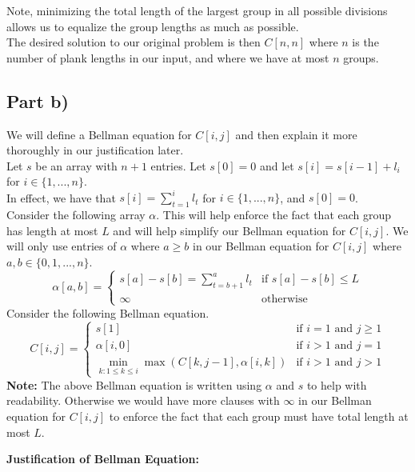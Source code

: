 \documentclass[12pt]{article}
\begin{document}
Note, minimizing the total length of the largest group in all possible divisions allows us to equalize the group lengths as much as possible. \\

The desired solution to our original problem is then $C[n,n]$ where $n$ is the number of plank lengths in our input, and where we have at most $n$ groups. 

\subsection*{Part b)}

We will define a Bellman equation for $C[i,j]$ and then explain it more thoroughly in our justification later. \\

Let $s$ be an array with $n+1$ entries. Let $s[0] = 0$ and let $s[i] = s[i-1] + l_i$ for $i \in \{1,...,n\}$. \\

In effect, we have that $s[i] = \sum_{t=1}^i l_t$ for $i \in \{1,...,n\}$, and $s[0] = 0$. \\

Consider the following array $\alpha$. This will help enforce the fact that each group has length at most $L$ and will help simplify our Bellman equation for $C[i,j]$. We will only use entries of $\alpha$ where $a \geq b$ in our Bellman equation for $C[i,j]$ where $a,b \in \{0,1,...,n\}$.
\[
  \alpha[a,b] =
  \begin{cases}
        s[a] - s[b] = \sum_{t=b+1}^a l_t &\text{if $s[a] - s[b] \leq L$} \\
        \infty &\text{otherwise}
  \end{cases}
\]
Consider the following Bellman equation.
\[
  C[i,j] =
  \begin{cases}
        s[1]    & \text{if $i = 1$ and $j \geq 1$} \\
        \alpha[i,0] &\text{if $i > 1$ and $j = 1$} \\
        \min\limits_{k: 1 \leq k \leq i} \max(C[k,j-1], \alpha[i,k]) &\text{if $i > 1$ and $j > 1$}       
  \end{cases}
\]
\textbf{Note:} The above Bellman equation is written using $\alpha$ and $s$ to help with readability. Otherwise we would have more clauses with $\infty$ in our Bellman equation for $C[i,j]$ to enforce the fact that each group must have total length at most $L$. 

\newpage

\textbf{Justification of Bellman Equation:} \\
\end{document}
